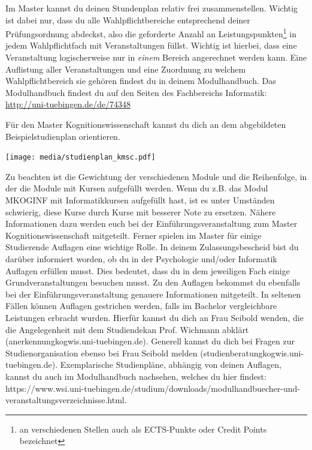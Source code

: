 Im Master kannst du deinen Stundenplan relativ frei zusammenstellen.
Wichtig ist dabei nur, dass du alle Wahlpflichtbereiche entsprechend deiner Prüfungsordnung abdeckst,
also die geforderte Anzahl an Leistungspunkten\footnote{an verschiedenen Stellen auch als ECTS-Punkte oder Credit Points bezeichnet}
in jedem Wahlpflichtfach mit Veranstaltungen füllst. Wichtig ist hierbei, dass eine Veranstaltung logischerweise nur in \emph{einem} Bereich angerechnet
werden kann.
Eine Auflistung aller Veranstaltungen und eine Zuordnung zu welchem Wahlpflichtbereich sie gehören
findest du in deinem Modulhandbuch. Das Modulhandbuch findest du auf den Seiten des Fachbereichs Informatik: \\ 
\url{http://uni-tuebingen.de/de/74348}

\ifkogwiss
Für den Master Kognitionswissenschaft kannst du dich an dem abgebildeten Beispielstudienplan orientieren.
\begin{center}
	\texttt{[image: media/studienplan\_kmsc.pdf]}
\end{center}
Zu beachten ist die Gewichtung der verschiedenen Module und die Reihenfolge, in der die Module mit Kursen aufgefüllt werden. Wenn
du z.B. das Modul MKOGINF mit Informatikkursen aufgefüllt hast, ist es unter Umständen schwierig, diese Kurse durch Kurse mit
besserer Note zu ersetzen. Nähere Informationen dazu werden euch bei der Einführungsveranstaltung zum Master Kognitionswissenschaft mitgeteilt. Ferner spielen im Master für einige Studierende Auflagen eine wichtige Rolle. In deinem Zulassungsbescheid bist du darüber informiert worden, ob du in der Psychologie und/oder Informatik Auflagen erfüllen musst. Dies bedeutet, dass du in dem jeweiligen Fach einige Grundveranstaltungen besuchen musst. Zu den Auflagen bekommst du ebenfalls bei der Einführungsveranstaltung genauere Informationen mitgeteilt. In seltenen Fällen können Auflagen gestrichen werden, falls im Bachelor vergleichbare Leistungen erbracht wurden. Hierfür kannst du dich an Frau Seibold wenden, die die Angelegenheit mit dem Studiendekan Prof. Wichmann abklärt (anerkennung\At kogwis.uni-tuebingen.de). Generell kannst du dich bei Fragen zur Studienorganisation ebenso bei Frau Seibold melden (studienberatung\At kogwis.uni-tuebingen.de). Exemplarische Studienpläne, abhängig von deinen Auflagen, kannst du auch im Modulhandbuch nachsehen, welches du hier findest: https://www.wsi.uni-tuebingen.de/studium/downloads/modulhandbuecher-und-veranstaltungsverzeichnisse.html.
\fi

